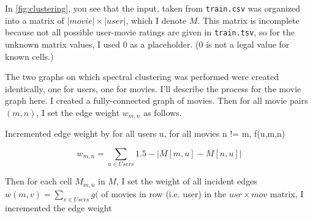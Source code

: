 \documentclass{article}
\begin{document}
    In \ref{fig:clustering}, you see that the input, taken from \texttt{train.csv} was organized into a matrix of $|movie|\times |user|$, which I denote $M$. This matrix is incomplete because not all possible user-movie ratings are given in \texttt{train.tsv}, so for the unknown matrix values, I used 0 as a placeholder. (0 is not a legal value for known cells.)
    
    The two graphs on which spectral clustering was performed were created identically, one for users, one for movies. I'll describe the process for the movie graph here. I created a fully-connected graph of movies. Then for all movie pairs $(m,n)$, I set the edge weight $w_{m,n}$ as follows.
    
    Incremented edge weight by 
    for all users u, for all movies n != m, f(u,m,n)
    
    $$w_{m,n} = \sum_{u \in Users} 1.5 - |M[m,u] - M[n,u]|$$
    
    Then for each cell $M_{m,u}$ in $M$, I set the weight of all incident edges $w(m,v) = \sum_{v \in Users} g($ of movies in row (i.e. user) in the $usr \times mov$ matrix, I incremented the edge weight 
\end{document}
